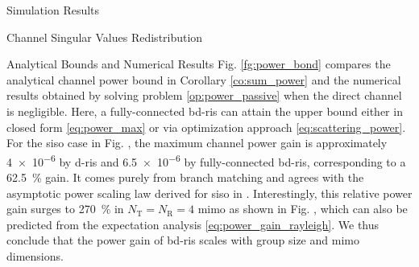 \documentclass[journal]{IEEEtran}
\begin{document}
\begin{section}{Simulation Results}
\begin{subsection}{Channel Singular Values Redistribution}
\begin{subsubsection}{Analytical Bounds and Numerical Results}
			Fig. \ref{fg:power_bond} compares the analytical channel power bound in Corollary \ref{co:sum_power} and the numerical results obtained by solving problem \eqref{op:power_passive} when the direct channel is negligible.
			Here, a fully-connected \gls{bd}-\gls{ris} can attain the upper bound either in closed form \eqref{eq:power_max} or via optimization approach \eqref{eq:scattering_power}.
			For the \gls{siso} case in Fig. , the maximum channel power gain is approximately \num{4e-6} by \gls{d}-\gls{ris} and \num{6.5e-6} by fully-connected \gls{bd}-\gls{ris}, corresponding to a \qty{62.5}{\percent} gain.
			It comes purely from branch matching and agrees with the asymptotic power scaling law derived for \gls{siso} in \cite[(30)]{Shen2020a}.
			Interestingly, this relative power gain surges to \qty{270}{\percent} in $N_\mathrm{T}=N_\mathrm{R}=4$ \gls{mimo} as shown in Fig. , which can also be predicted from the expectation analysis \eqref{eq:power_gain_rayleigh}.
			We thus conclude that the power gain of \gls{bd}-\gls{ris} scales with group size and \gls{mimo} dimensions.
		\end{subsubsection}

	\end{subsection}


\end{section}
\end{document}
